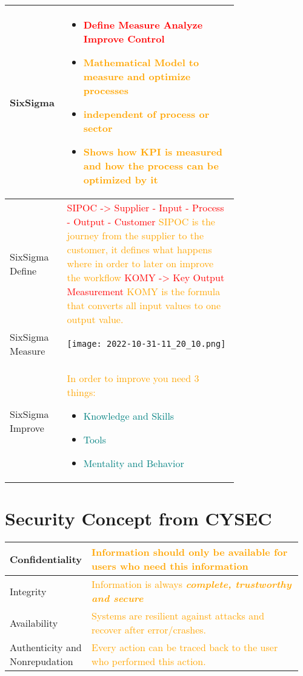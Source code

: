\documentclass[main.tex,fontsize=8pt,paper=a4,paper=portrait,DIV=calc,]{scrartcl}
\begin{document}
\begin{table}[h!]
\begin{tabular}{|m{0,205\linewidth}|m{0.75\linewidth}|}
\hline
SixSigma & 
\vspace{2mm}
\begin{itemize}
\item \textcolor{red}{\textbf{Define Measure Analyze Improve Control}}
\item \textcolor{orange}{Mathematical Model to measure and optimize processes}
\item \textcolor{orange}{independent of process or sector}
\item \textcolor{orange}{Shows how KPI is measured and how the process can be optimized by it}
\vspace{-3mm}
\end{itemize}\\
\hline
SixSigma Define &
\textcolor{red}{SIPOC -> Supplier - Input - Process - Output - Customer}\newline
\textcolor{orange}{SIPOC is the journey from the supplier to the customer, \newline
it defines what happens where in order to later on improve the workflow}\newline
\textcolor{red}{KOMY -> Key Output Measurement}\newline
\textcolor{orange}{KOMY is the formula that converts all input values to one output value.}\\
\hline
SixSigma Measure & 
\vspace{2mm}
\texttt{[image: 2022-10-31-11\_20\_10.png]}\\
\hline
SixSigma Improve & 
\textcolor{orange}{In order to improve you need 3 things:}\newline
\begin{itemize}
\item \textcolor{teal}{Knowledge and Skills}
\item \textcolor{teal}{Tools}
\item \textcolor{teal}{Mentality and Behavior}
\vspace{-3mm}
\end{itemize}\\
\hline
\end{tabular}
\section{Security Concept from CYSEC}
\begin{tabular}{|m{0.2\linewidth}|m{0.755\linewidth}|}
\hline
Confidentiality &
\textcolor{orange}{Information should only be available for users who need this information}\\
\hline
Integrity & 
\textcolor{orange}{Information is always \textbf{\textit{complete, trustworthy and secure}}}\\
\hline
Availability &
\textcolor{orange}{Systems are resilient against attacks and recover after error/crashes.}\\
\hline
Authenticity and Nonrepudation &
\textcolor{orange}{Every action can be traced back to the user who performed this action.}\\
\hline
\end{tabular}
\end{table}
\begin{table}[h!]
\begin{tabular}{|m{0,205\linewidth}|m{0.75\linewidth}|}
\hline

\hline
\end{tabular}
\end{table}
\end{document}
